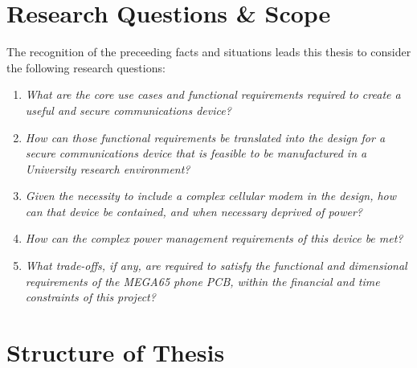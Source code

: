 
\section{Research Questions \& Scope}
\label{sec3}

The recognition of the preceeding facts and situations leads this thesis to consider the following research questions:
\begin{enumerate}
	\item \textit{What are the core use cases and functional requirements required to create a useful and secure communications device?}
	\item \textit{How can those functional requirements be translated into the design for a secure communications device that is feasible to be manufactured in a University research environment?}
	\item \textit{Given the necessity to include a complex cellular modem in the design, how can that device be contained, and when necessary deprived of power?}
	\item \textit{How can the complex power management requirements of this device be met?}
	\item \textit{What trade-offs, if any, are required to satisfy the functional and dimensional requirements of the MEGA65 phone PCB, within the financial and time constraints of this project?}
\end{enumerate}

\section{Structure of Thesis}

